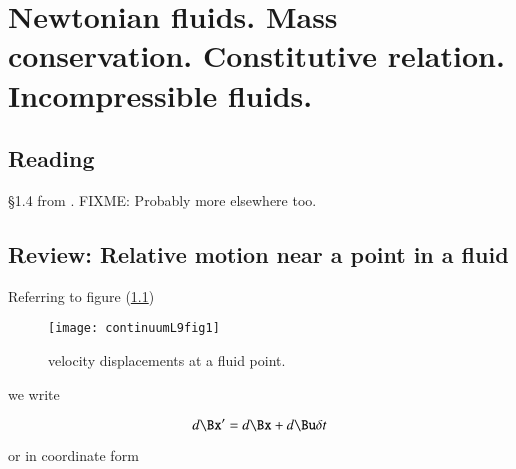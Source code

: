 %
%

\chapter{Newtonian fluids.  Mass conservation.  Constitutive relation.  Incompressible fluids.}
\label{chap:continuumL9}
{}
\date{Feb 8, 2012}

\beginArtWithToc

\section{Reading}

\S 1.4 from \cite{acheson1990elementary}.  FIXME: Probably more elsewhere too.

%

\section{Review: Relative motion near a point in a fluid}

Referring to figure (\ref{fig:continuumL9:continuumL9fig1})
\begin{figure}[htp]
   \centering
   \texttt{[image: continuumL9fig1]}
   \caption{velocity displacements at a fluid point.}\label{fig:continuumL9:continuumL9fig1}
\end{figure}

we write

\begin{equation}\label{eqn:continuumL9:10}
d\Bx' = d\Bx + d\Bu \delta t
\end{equation}

or in coordinate form

